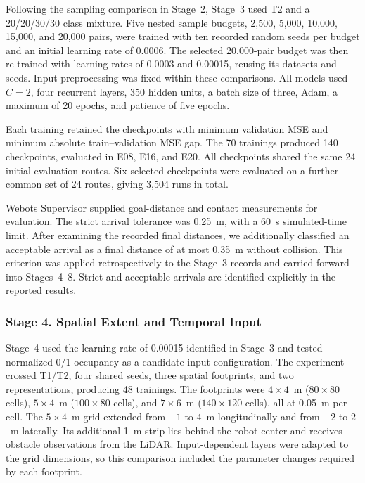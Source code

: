 \documentclass[robotics,article,submit,pdftex,moreauthors]{Definitions/mdpi}
\begin{document}
Following the sampling comparison in Stage~2, Stage~3 used T2 and a 20/20/30/30 class mixture. Five nested sample budgets, 2,500, 5,000, 10,000, 15,000, and 20,000 pairs, were trained with ten recorded random seeds per budget and an initial learning rate of 0.0006. The selected 20,000-pair budget was then re-trained with learning rates of 0.0003 and 0.00015, reusing its datasets and seeds. Input preprocessing was fixed within these comparisons.
 All models used $C=2$, four recurrent layers, 350 hidden units, a batch size of three, Adam, a maximum of 20 epochs, and patience of five epochs.

Each training retained the checkpoints with minimum validation MSE and minimum absolute train--validation MSE gap. The 70 trainings produced 140 checkpoints, evaluated in E08, E16, and E20. All checkpoints shared the same 24 initial evaluation routes. Six selected checkpoints were evaluated on a further common set of 24 routes, giving 3,504 runs in total.

Webots Supervisor supplied goal-distance and contact measurements for evaluation. The strict arrival tolerance was 0.25~m, with a 60~s simulated-time limit. After examining the recorded final distances, we additionally classified an acceptable arrival as a final distance of at most 0.35~m without collision. This criterion was applied retrospectively to the Stage~3 records and carried forward into Stages~4--8. Strict and acceptable arrivals are identified explicitly in the reported results.

\subsubsection{Stage 4. Spatial Extent and Temporal Input}\label{subsec:stage4_setup}

Stage~4 used the learning rate of 0.00015 identified in Stage~3 and tested normalized 0/1 occupancy as a candidate input configuration. The experiment crossed T1/T2, four shared seeds, three spatial footprints, and two representations, producing 48 trainings. The footprints were $4\times4$~m ($80\times80$ cells), $5\times4$~m ($100\times80$ cells), and $7\times6$~m ($140\times120$ cells), all at 0.05~m per cell. The $5\times4$~m grid extended from $-1$ to $4$~m longitudinally and from $-2$ to $2$~m laterally. Its additional 1~m strip lies behind the robot center and receives obstacle observations from the LiDAR. Input-dependent layers were adapted to the grid dimensions, so this comparison included the parameter changes required by each footprint.
\end{document}

